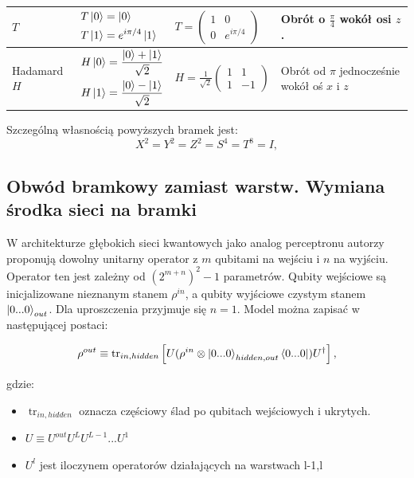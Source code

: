\begin{table}[H]
{\begin{tabular}{l l l l}
        \hline
        $T$ & $\begin{aligned} T\ket{0} &= \ket{0} \\ T\ket{1} &= e^{i\pi/4}\ket{1} \end{aligned}$ & $T = \begin{pmatrix} 1 & 0 \\ 0 & e^{i\pi/4} \end{pmatrix}$ & Obrót o $\frac{\pi}{4}$ wokół osi $z$. \\
        \hline
        Hadamard $H$ & $\begin{aligned} H\ket{0} &= \frac{\ket{0} + \ket{1}}{\sqrt{2}} \\ H\ket{1} &= \frac{\ket{0} - \ket{1}}{\sqrt{2}} \end{aligned}$ & $H = \frac{1}{\sqrt{2}} \begin{pmatrix} 1 & 1 \\ 1 & -1 \end{pmatrix}$ & Obrót od $\pi$ jednocześnie wokół oś $x$ i $z$ \\
        \hline
    \end{tabular}
}

\end{table}

Szczególną własnością powyższych bramek jest:
\[X^2 = Y^2 = Z^2 = S^4 = T^8 = I,\]

\subsection{Obwód bramkowy zamiast warstw. Wymiana środka sieci na bramki}
W architekturze głębokich sieci kwantowych jako analog perceptronu autorzy \cite{training_deep_quantum_nn} proponują dowolny unitarny operator z $m$ qubitami na wejściu i $n$ na wyjściu. Operator ten jest zależny od $(2^{m+n})^2-1$ parametrów. Qubity wejściowe są inicjalizowane nieznanym stanem $\rho^{in}$, a qubity wyjściowe czystym stanem $\ket{0...0}_{out}$. Dla uproszczenia przyjmuje się $n = 1$. Model można zapisać w następującej postaci:

\begin{equation}\label{eq:stan_wyjscie_1}
    \rho^{out} \equiv \operatorname{tr}_{in,hidden} \left[ U (\rho^{in} \otimes \ket{0...0}_{hidden,out}\bra{0...0}) U^{\dagger} \right],
\end{equation}

gdzie:
\begin{itemize}
    \item $\operatorname{tr}_{in,hidden}$ oznacza częściowy ślad po qubitach wejściowych i ukrytych.
    \item $U \equiv U^{out}U^L U^{L-1} ... U^1$
    \item $U^l$ jest iloczynem operatorów działających na warstwach l-1,l
\end{itemize}

